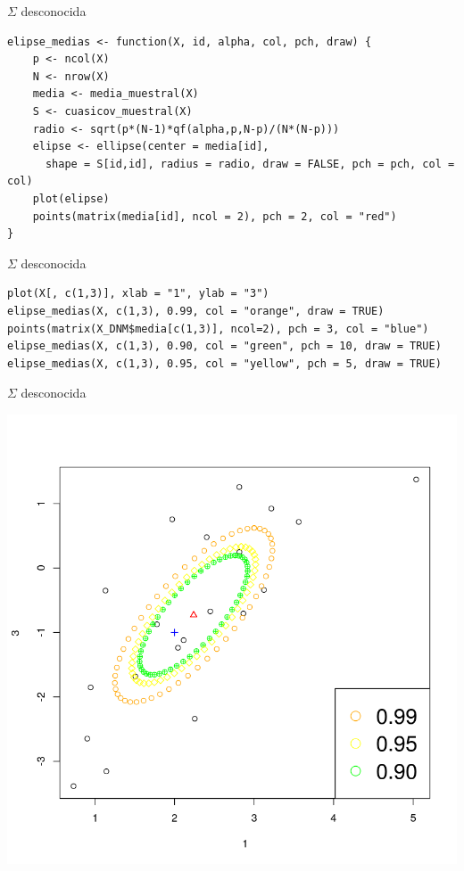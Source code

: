 \documentclass[xcolor=table]{beamer}
\begin{document}
\begin{frame}[fragile]{$\Sigma$ desconocida}

\begin{lstlisting}
elipse_medias <- function(X, id, alpha, col, pch, draw) {
    p <- ncol(X)
    N <- nrow(X)
    media <- media_muestral(X)
    S <- cuasicov_muestral(X)
    radio <- sqrt(p*(N-1)*qf(alpha,p,N-p)/(N*(N-p)))
    elipse <- ellipse(center = media[id], 
      shape = S[id,id], radius = radio, draw = FALSE, pch = pch, col = col)
    plot(elipse)
    points(matrix(media[id], ncol = 2), pch = 2, col = "red")
}
\end{lstlisting}

\end{frame}


\begin{frame}[fragile]{$\Sigma$ desconocida}

\begin{lstlisting}
plot(X[, c(1,3)], xlab = "1", ylab = "3")
elipse_medias(X, c(1,3), 0.99, col = "orange", draw = TRUE)
points(matrix(X_DNM$media[c(1,3)], ncol=2), pch = 3, col = "blue")
elipse_medias(X, c(1,3), 0.90, col = "green", pch = 10, draw = TRUE)
elipse_medias(X, c(1,3), 0.95, col = "yellow", pch = 5, draw = TRUE)
\end{lstlisting}

\end{frame}


\begin{frame}[fragile]{$\Sigma$ desconocida}

\begin{center}
\includegraphics[scale=0.4]{superficie2.png}
\end{center}
\end{frame}
\end{document}

